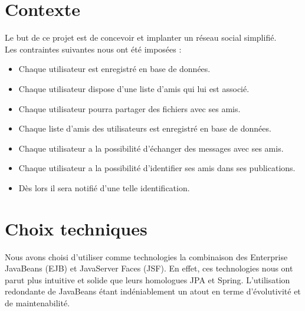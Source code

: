 \documentclass[12pt,a4paper,titlepage]{article}
\begin{document}



\clearpage{\pagestyle{empty}}



\section{Contexte}
Le but de ce projet est de concevoir et implanter un réseau social simplifié.\\
Les contraintes suivantes nous ont été imposées :
\begin{itemize}
\item Chaque utilisateur est enregistré en base de données.
\item Chaque utilisateur dispose d'une liste d'amis qui lui est associé.
\item Chaque utilisateur pourra partager des fichiers avec ses amis.
\item Chaque liste d'amis des utilisateurs est enregistré en base de données.
\item Chaque utilisateur a la possibilité d'échanger des messages avec ses amis.
\item Chaque utilisateur a la possibilité d'identifier ses amis dans ses publications.
\item Dès lors il sera notifié d'une telle identification.
\end{itemize}






\clearpage{\pagestyle{empty}}



\section{Choix techniques}
Nous avons choisi d'utiliser comme technologies la combinaison des Enterprise JavaBeans (EJB)
et JavaServer Faces (JSF). En effet, ces technologies nous ont parut plus intuitive et solide 
que leurs homologues JPA et Spring. L'utilisation redondante de JavaBeans étant indéniablement 
un atout en terme d'évolutivité et de maintenabilité.



\end{document}
